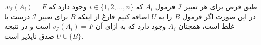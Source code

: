 \documentclass[]{exam}
\begin{document}
    طبق فرض برای هر تعبیر
    $\mathscr{I}$
    فرمول
    $A_i$
    که
    $i \in \{1, 2, \dots, n\}$
    وجود دارد که 
    $v_\mathscr{I} (A_i) = F$.
    در این صورت اگر فرمول 
    $B$
    را به 
    $U$
    اضافه کنیم فارغ از اینکه
    $B$
    برای تعبیر 
    $\mathscr{I}$
    درست یا غلط است،
    همچنان
    $A_i$
    وجود دارد که به ازای آن
    $v_\mathscr{I} (A_i) = F$
    است و در نتیجه 
    $U \cup \{B\}$
    صدق ناپذیر است.
\end{document}
